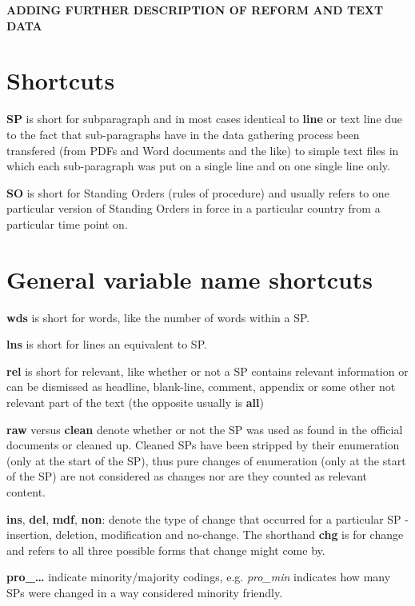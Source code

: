 \documentclass[]{article}
\begin{document}
\textbf{ADDING FURTHER DESCRIPTION OF REFORM AND TEXT DATA}

\section{Shortcuts}\label{shortcuts}

\textbf{SP} is short for subparagraph and in most cases identical to
\textbf{line} or text line due to the fact that sub-paragraphs have in
the data gathering process been transfered (from PDFs and Word documents
and the like) to simple text files in which each sub-paragraph was put
on a single line and on one single line only.

\textbf{SO} is short for Standing Orders (rules of procedure) and
usually refers to one particular version of Standing Orders in force in
a particular country from a particular time point on.

\section{General variable name
shortcuts}\label{general-variable-name-shortcuts}

\textbf{wds} is short for words, like the number of words within a SP.

\textbf{lns} is short for lines an equivalent to SP.

\textbf{rel} is short for relevant, like whether or not a SP contains
relevant information or can be dismissed as headline, blank-line,
comment, appendix or some other not relevant part of the text (the
opposite usually is \textbf{all})

\textbf{raw} versus \textbf{clean} denote whether or not the SP was used
as found in the official documents or cleaned up. Cleaned SPs have been
stripped by their enumeration (only at the start of the SP), thus pure
changes of enumeration (only at the start of the SP) are not considered
as changes nor are they counted as relevant content.

\textbf{ins}, \textbf{del}, \textbf{mdf}, \textbf{non}: denote the type
of change that occurred for a particular SP - insertion, deletion,
modification and no-change. The shorthand \textbf{chg} is for change and
refers to all three possible forms that change might come by.

\textbf{pro\_\ldots{}} indicate minority/majority codings, e.g.
\emph{pro\_min} indicates how many SPs were changed in a way considered
minority friendly.
\end{document}
